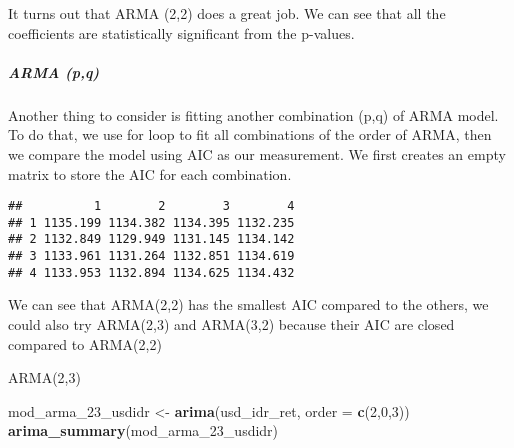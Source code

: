 \documentclass[]{article}
\newenvironment{Shaded}{\begin{snugshade}}{\end{snugshade}}
\newcommand{\KeywordTok}[1]{\textcolor[rgb]{0.13,0.29,0.53}{\textbf{#1}}}
\newcommand{\DataTypeTok}[1]{\textcolor[rgb]{0.13,0.29,0.53}{#1}}
\newcommand{\DecValTok}[1]{\textcolor[rgb]{0.00,0.00,0.81}{#1}}
\newcommand{\StringTok}[1]{\textcolor[rgb]{0.31,0.60,0.02}{#1}}
\newcommand{\CommentTok}[1]{\textcolor[rgb]{0.56,0.35,0.01}{\textit{#1}}}
\newcommand{\OtherTok}[1]{\textcolor[rgb]{0.56,0.35,0.01}{#1}}
\newcommand{\ControlFlowTok}[1]{\textcolor[rgb]{0.13,0.29,0.53}{\textbf{#1}}}
\newcommand{\OperatorTok}[1]{\textcolor[rgb]{0.81,0.36,0.00}{\textbf{#1}}}
\newcommand{\NormalTok}[1]{#1}
\let\oldsubparagraph\subparagraph
\renewcommand{\subparagraph}[1]{\oldsubparagraph{#1}\mbox{}}
\begin{document}
It turns out that ARMA (2,2) does a great job. We can see that all the
coefficients are statistically significant from the p-values.

\subparagraph{ARMA (p,q)}\label{arma-pq}

Another thing to consider is fitting another combination (p,q) of ARMA
model. To do that, we use for loop to fit all combinations of the order
of ARMA, then we compare the model using AIC as our measurement. We
first creates an empty matrix to store the AIC for each combination.

\begin{Shaded}
\end{Shaded}

\begin{verbatim}
##          1        2        3        4
## 1 1135.199 1134.382 1134.395 1132.235
## 2 1132.849 1129.949 1131.145 1134.142
## 3 1133.961 1131.264 1132.851 1134.619
## 4 1133.953 1132.894 1134.625 1134.432
\end{verbatim}

We can see that ARMA(2,2) has the smallest AIC compared to the others,
we could also try ARMA(2,3) and ARMA(3,2) because their AIC are closed
compared to ARMA(2,2)

ARMA(2,3)

\begin{Shaded}
\begin{Highlighting}[]
\NormalTok{mod_arma_23_usdidr <-}\StringTok{ }\KeywordTok{arima}\NormalTok{(usd_idr_ret, }\DataTypeTok{order =} \KeywordTok{c}\NormalTok{(}\DecValTok{2}\NormalTok{,}\DecValTok{0}\NormalTok{,}\DecValTok{3}\NormalTok{)) }
\KeywordTok{arima_summary}\NormalTok{(mod_arma_23_usdidr) }
\end{Highlighting}
\end{Shaded}
\end{document}
